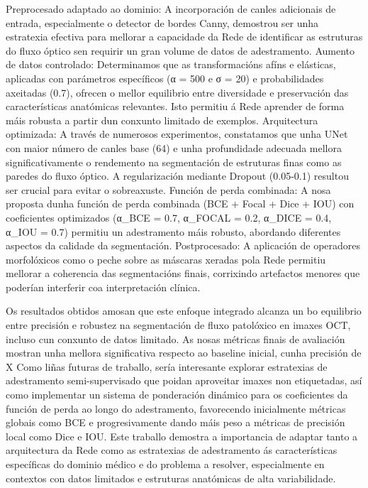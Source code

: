 \documentclass{article}
\begin{document}
Preprocesado adaptado ao dominio: A incorporación de canles adicionais de entrada, especialmente o detector de bordes Canny, demostrou ser unha estratexia efectiva para mellorar a capacidade da Rede de identificar as estruturas do fluxo óptico sen requirir un gran volume de datos de adestramento.
Aumento de datos controlado: Determinamos que as transformacións afíns e elásticas, aplicadas con parámetros específicos (α = 500 e σ = 20) e probabilidades axeitadas (0.7), ofrecen o mellor equilibrio entre diversidade e preservación das características anatómicas relevantes. Isto permitiu á Rede aprender de forma máis robusta a partir dun conxunto limitado de exemplos.
Arquitectura optimizada: A través de numerosos experimentos, constatamos que unha UNet con maior número de canles base (64) e unha profundidade adecuada mellora significativamente o rendemento na segmentación de estruturas finas como as paredes do fluxo óptico. A regularización mediante Dropout (0.05-0.1) resultou ser crucial para evitar o sobreaxuste.
Función de perda combinada: A nosa proposta dunha función de perda combinada (BCE + Focal + Dice + IOU) con coeficientes optimizados (α_BCE = 0.7, α_FOCAL = 0.2, α_DICE = 0.4, α_IOU = 0.7) permitiu un adestramento máis robusto, abordando diferentes aspectos da calidade da segmentación.
Postprocesado: A aplicación de operadores morfolóxicos como o peche sobre as máscaras xeradas pola Rede permitiu mellorar a coherencia das segmentacións finais, corrixindo artefactos menores que poderían interferir coa interpretación clínica.

Os resultados obtidos amosan que este enfoque integrado alcanza un bo equilibrio entre precisión e robustez na segmentación de fluxo patolóxico en imaxes OCT, incluso cun conxunto de datos limitado. As nosas métricas finais de avaliación mostran unha mellora significativa respecto ao baseline inicial, cunha precisión de X%
Como liñas futuras de traballo, sería interesante explorar estratexias de adestramento semi-supervisado que poidan aproveitar imaxes non etiquetadas, así como implementar un sistema de ponderación dinámico para os coeficientes da función de perda ao longo do adestramento, favorecendo inicialmente métricas globais como BCE e progresivamente dando máis peso a métricas de precisión local como Dice e IOU.
Este traballo demostra a importancia de adaptar tanto a arquitectura da Rede como as estratexias de adestramento ás características específicas do dominio médico e do problema a resolver, especialmente en contextos con datos limitados e estruturas anatómicas de alta variabilidade.

\newpage



\end{document}
